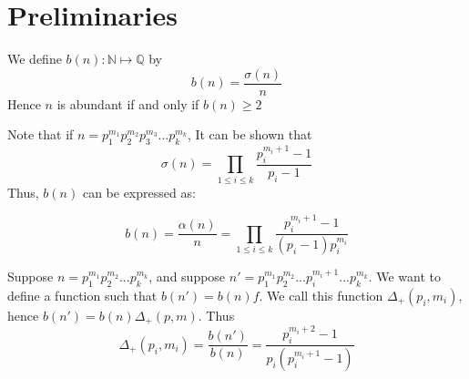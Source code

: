 \documentclass[../paper.tex]{article}
\begin{document}
\section{Preliminaries}

We define $b(n): \mathbb{N} \mapsto \mathbb{Q}$ by
%
$$b(n) = \frac{\sigma(n)}{n} $$
%
Hence $n$ is abundant if and only if $b(n) \geq 2$

Note that if $n=p_1^{m_1}p_2^{m_2}p_3^{m_3}...p_{k}^{m_k}$,
It can be shown that 
%
$$\sigma(n) = \prod_{1 \leq i \leq k} \frac{p_i^{m_i + 1} -1}{p_i -1}$$
%
Thus, $b(n)$ can be expressed as:

$$b(n) = \frac{\alpha(n)}{n} = \prod_{1 \leq i \leq k} 
\frac{p_i^{m_i + 1} -1}{(p_i -1)p_{i}^{m_{i}}}$$

	Suppose $n=p_1^{m_1}p_2^{m_2}...p_{k}^{m_k}$, and suppose 
$n'=p_1^{m_1}p_2^{m_2}...p_i^{m_i + 1}...p_{k}^{m_k}$. We want
to define a function such that $b(n') = b(n) f$. We call this
function $\Delta_{+}(p_i, m_i)$, hence $b(n') = b(n) \Delta_{+}(p,m)$.
Thus 
%
$$\Delta_{+}(p_i, m_i) = \frac{b(n')}{b(n)} = 
\frac{p_i^{m_i+2} - 1}{ p_i (p_i^{m_i + 1} - 1)}$$
%
\end{document}

